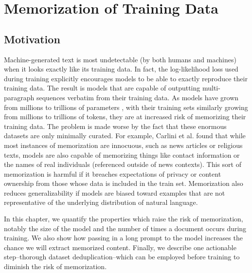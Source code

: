 \newcommand{\Approx}[0]{\textsc{NearDup}}
\newcommand{\Exact}[0]{\textsc{ExactSubstr}}
\newcommand{\Original}[0]{\textsc{Original}}
\newcommand{\pl}[1]{\hl{#1}}


\chapter{Memorization of Training Data}
\label{chap:memorization}

\section{Motivation}
Machine-generated text is most undetectable (by both humans and machines) when it looks exactly like its training data.
In fact, the log-likelihood loss used during training explicitly encourages models to be able to exactly reproduce their training data.
The result is models that are capable of outputting multi-paragraph sequences verbatim from their training data.
As models have grown from millions to trillions of parameters \citep{fedus2021switch}, with their training sets similarly growing from millions to trillions of tokens, they  are at increased risk of memorizing their training data.
The problem is made worse by the fact that these enormous datasets are only minimally curated.
For example, Carlini et al. \citep{carlini2020extracting} found that while most instances of memorization are innocuous, such as news articles or religious texts, models are also capable of memorizing things like contact information or the names of real individuals (referenced outside of news contexts).
This sort of memorization is harmful if it breaches expectations of privacy or content ownership from those whose data is included in the train set.
Memorization also reduces generalizability if models are biased toward examples that are not representative of the underlying distribution of natural language.

In this chapter, we quantify the properties which raise the risk of memorization, notably the size of the model and the number of times a document occurs during training.
We also show how passing in a long prompt to the model increases the chance we will extract memorized content.
Finally, we describe one actionable step--thorough dataset deduplication--which can be employed before training to diminish the risk of memorization.


